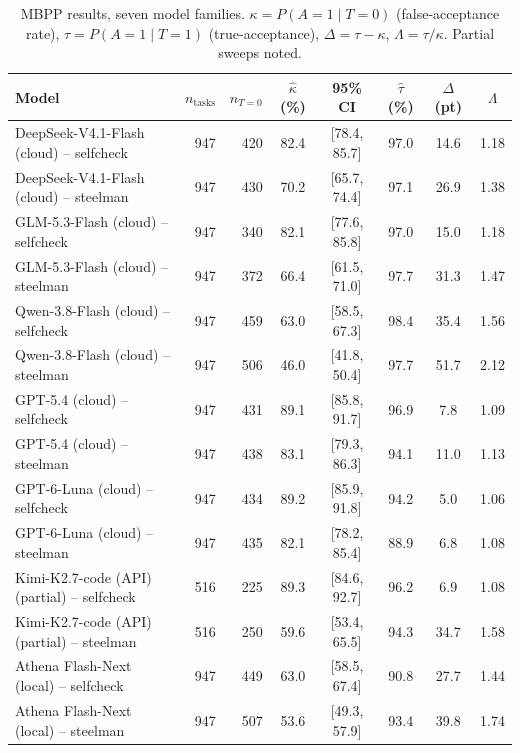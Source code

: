 \begin{table}[t]
\centering
\caption{MBPP results, seven model families. $\kappa = P(A{=}1 \mid T{=}0)$
(false-acceptance rate), $\tau = P(A{=}1 \mid T{=}1)$ (true-acceptance),
$\Delta = \tau - \kappa$, $\Lambda = \tau/\kappa$. Partial sweeps noted.}
\label{tab:kappa_mbpp}
\begin{tabular}{lrrccccc}
\hline
Model & $n_\text{tasks}$ & $n_{T=0}$ & $\hat\kappa$ (\%) & 95\% CI &
$\hat\tau$ (\%) & $\Delta$ (pt) & $\Lambda$ \\
\hline
DeepSeek-V4.1-Flash (cloud) -- selfcheck & 947 & 420 & 82.4 & [78.4, 85.7] & 97.0 & 14.6 & 1.18 \\
DeepSeek-V4.1-Flash (cloud) -- steelman & 947 & 430 & 70.2 & [65.7, 74.4] & 97.1 & 26.9 & 1.38 \\
GLM-5.3-Flash (cloud) -- selfcheck & 947 & 340 & 82.1 & [77.6, 85.8] & 97.0 & 15.0 & 1.18 \\
GLM-5.3-Flash (cloud) -- steelman & 947 & 372 & 66.4 & [61.5, 71.0] & 97.7 & 31.3 & 1.47 \\
Qwen-3.8-Flash (cloud) -- selfcheck & 947 & 459 & 63.0 & [58.5, 67.3] & 98.4 & 35.4 & 1.56 \\
Qwen-3.8-Flash (cloud) -- steelman & 947 & 506 & 46.0 & [41.8, 50.4] & 97.7 & 51.7 & 2.12 \\
GPT-5.4 (cloud) -- selfcheck & 947 & 431 & 89.1 & [85.8, 91.7] & 96.9 & 7.8 & 1.09 \\
GPT-5.4 (cloud) -- steelman & 947 & 438 & 83.1 & [79.3, 86.3] & 94.1 & 11.0 & 1.13 \\
GPT-6-Luna (cloud) -- selfcheck & 947 & 434 & 89.2 & [85.9, 91.8] & 94.2 & 5.0 & 1.06 \\
GPT-6-Luna (cloud) -- steelman & 947 & 435 & 82.1 & [78.2, 85.4] & 88.9 & 6.8 & 1.08 \\
Kimi-K2.7-code (API) (partial) -- selfcheck & 516 & 225 & 89.3 & [84.6, 92.7] & 96.2 & 6.9 & 1.08 \\
Kimi-K2.7-code (API) (partial) -- steelman & 516 & 250 & 59.6 & [53.4, 65.5] & 94.3 & 34.7 & 1.58 \\
Athena Flash-Next (local) -- selfcheck & 947 & 449 & 63.0 & [58.5, 67.4] & 90.8 & 27.7 & 1.44 \\
Athena Flash-Next (local) -- steelman & 947 & 507 & 53.6 & [49.3, 57.9] & 93.4 & 39.8 & 1.74 \\
\hline
\end{tabular}
\end{table}
